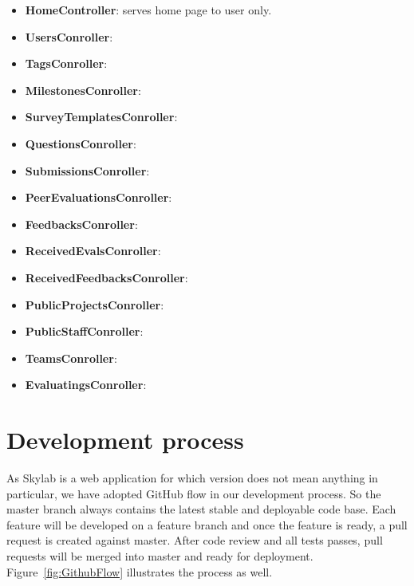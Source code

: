\begin{itemize}
  \item \textbf{HomeController}: serves home page to user only.
  \item \textbf{UsersConroller}: 
  \item \textbf{TagsConroller}: 
  \item \textbf{MilestonesConroller}: 
  \item \textbf{SurveyTemplatesConroller}: 
  \item \textbf{QuestionsConroller}: 
  \item \textbf{SubmissionsConroller}: 
  \item \textbf{PeerEvaluationsConroller}: 
  \item \textbf{FeedbacksConroller}: 
  \item \textbf{ReceivedEvalsConroller}: 
  \item \textbf{ReceivedFeedbacksConroller}: 
  \item \textbf{PublicProjectsConroller}: 
  \item \textbf{PublicStaffConroller}: 
  \item \textbf{TeamsConroller}: 
  \item \textbf{EvaluatingsConroller}: 
\end{itemize} 

\section{Development process}

As Skylab is a web application for which version does not mean anything in particular, we have adopted GitHub flow in our development process\cite{citation8}. So the master branch always contains the latest stable and deployable code base. Each feature will be developed on a feature branch and once the feature is ready, a pull request is created against master. After code review and all tests passes, pull requests will be merged into master and ready for deployment. Figure~\ref{fig:GithubFlow} illustrates the process as well.

